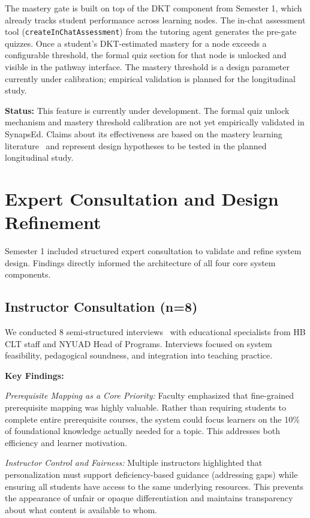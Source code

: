 \documentclass{stylefiles/capstone}
\begin{document}
The mastery gate is built on top of the DKT component from Semester 1, which already tracks student performance across learning nodes. The in-chat assessment tool (\texttt{createInChatAssessment}) from the tutoring agent generates the pre-gate quizzes. Once a student's DKT-estimated mastery for a node exceeds a configurable threshold, the formal quiz section for that node is unlocked and visible in the pathway interface. The mastery threshold is a design parameter currently under calibration; empirical validation is planned for the longitudinal study.

\textbf{Status:} This feature is currently under development. The formal quiz unlock mechanism and mastery threshold calibration are not yet empirically validated in SynapsEd. Claims about its effectiveness are based on the mastery learning literature~\cite{bloom1984sigma} and represent design hypotheses to be tested in the planned longitudinal study.

\section{Expert Consultation and Design Refinement}
\label{sec:expert}

Semester 1 included structured expert consultation to validate and refine system design. Findings directly informed the architecture of all four core system components.

\subsection{Instructor Consultation (n=8)}

We conducted 8 semi-structured interviews~\cite{ruslin2022semistructured} with educational specialists from HB CLT staff and NYUAD Head of Programs. Interviews focused on system feasibility, pedagogical soundness, and integration into teaching practice.

\textbf{Key Findings:}

\textit{Prerequisite Mapping as a Core Priority:} Faculty emphasized that fine-grained prerequisite mapping was highly valuable. Rather than requiring students to complete entire prerequisite courses, the system could focus learners on the 10\% of foundational knowledge actually needed for a topic. This addresses both efficiency and learner motivation.

\textit{Instructor Control and Fairness:} Multiple instructors highlighted that personalization must support deficiency-based guidance (addressing gaps) while ensuring all students have access to the same underlying resources. This prevents the appearance of unfair or opaque differentiation and maintains transparency about what content is available to whom.
\end{document}
